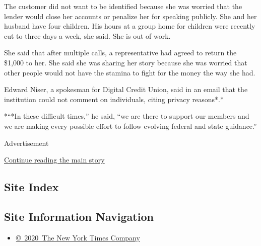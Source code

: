 The customer did not want to be identified because she was worried that
the lender would close her accounts or penalize her for speaking
publicly. She and her husband have four children. His hours at a group
home for children were recently cut to three days a week, she said. She
is out of work.

She said that after multiple calls, a representative had agreed to
return the \$1,000 to her. She said she was sharing her story because
she was worried that other people would not have the stamina to fight
for the money the way she had.

Edward Niser, a spokesman for Digital Credit Union, said in an email
that the institution could not comment on individuals, citing privacy
reasons*.*

*``*In these difficult times,'' he said, ``we are there to support our
members and we are making every possible effort to follow evolving
federal and state guidance.''

Advertisement

\protect\hyperlink{after-bottom}{Continue reading the main story}

\hypertarget{site-index}{%
\subsection{Site Index}\label{site-index}}

\hypertarget{site-information-navigation}{%
\subsection{Site Information
Navigation}\label{site-information-navigation}}

\begin{itemize}
\tightlist
\item
  \href{https://help.nytimes3xbfgragh.onion/hc/en-us/articles/115014792127-Copyright-notice}{©~2020~The
  New York Times Company}
\end{itemize}

